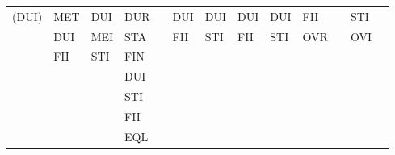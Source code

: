 \documentclass[11pt]{report}
\newenvironment{vvarmargin}[2]
{
  \begin{list}{}
  {
    \setlength{\topsep}{0pt}
    \setlength{\leftmargin}{0pt}
    \setlength{\rightmargin}{0pt}
    \setlength{\listparindent}{\parindent}
    \setlength{\itemindent}{\parindent}
    \setlength{\parsep}{0pt plus 1pt}
    \addtolength{\leftmargin}{#1}\addtolength{\rightmargin}{#2}
  }
  \item
}
{
  \end{list}
}
\begin{document}
\begin{table}[p]
\begin{vvarmargin}{-4cm}{-4cm}
\begin{center}
\begin{tabular}[t]{|r|l|l|l|l|l|l|l|l|l|l|l|l|}
                (DUI)                   & MET                     & DUI                     & DUR                     &                         & DUI                     & DUI                     & DUI                     & DUI                     & FII                     &                         & STI                     &                         \\
                                        & DUI                     & MEI                     & STA                     &                         & FII                     & STI                     & FII                     & STI                     & OVR                     &                         & OVI                     &                         \\
                                        & FII                     & STI                     & FIN                     &                         &                         &                         &                         &                         &                         &                         &                         &                         \\
                                        &                         &                         & DUI                     &                         &                         &                         &                         &                         &                         &                         &                         &                         \\
                                        &                         &                         & STI                     &                         &                         &                         &                         &                         &                         &                         &                         &                         \\
                                        &                         &                         & FII                     &                         &                         &                         &                         &                         &                         &                         &                         &                         \\
                                        &                         &                         & EQL                     &                         &                         &                         &                         &                         &                         &                         &                         &                         \\

\end{tabular}
\end{center}
\end{vvarmargin}
\end{table}
\end{document}
